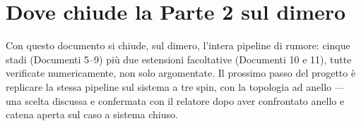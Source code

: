 \documentclass[11pt,a4paper]{article}
\begin{document}
\section{Dove chiude la Parte 2 sul dimero}

Con questo documento si chiude, sul dimero, l'intera pipeline di rumore:
cinque stadi (Documenti 5--9) più due estensioni facoltative (Documenti 10 e
11), tutte verificate numericamente, non solo argomentate. Il prossimo passo
del progetto è replicare la stessa pipeline sul sistema a tre spin, con la
topologia ad anello --- una scelta discussa e confermata con il relatore dopo
aver confrontato anello e catena aperta sul caso a sistema chiuso.
\end{document}
